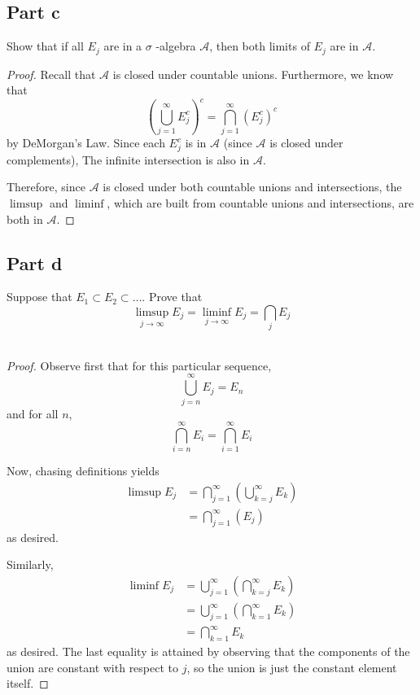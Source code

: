 \documentclass[paper=a4, fontsize=11pt]{scrartcl} %
\numberwithin{equation}{section} %
\numberwithin{figure}{section} %
\numberwithin{table}{section} %
\begin{document}
\subsection*{Part c}
Show that if all $E_j$ are in a $\sigma$ -algebra $\mathcal{A}$, then both limits of $E_j$ are
in $\mathcal{A}$.
\\
\begin{proof}
Recall that $\mathcal{A}$ is closed under countable unions. Furthermore, we know that
\[
\left(\bigcup_{j=1}^{\infty} E_j^c\right)^c = \bigcap_{j=1}^{\infty} \left(E_j^c\right)^c
\]
by DeMorgan's Law. Since each $E_j^c$ is in $\mathcal{A}$ (since $\mathcal{A}$ is closed under
complements), The infinite intersection is also in $\mathcal{A}$.

Therefore, since $\mathcal{A}$ is closed under both countable unions and intersections,
the $\limsup$ and $\liminf$, which are built from countable unions and intersections,
are both in $\mathcal{A}$.
\end{proof}

\subsection*{Part d}
Suppose that $E_1 \subset E_2 \subset \ldots$. Prove that
\[
\limsup_{j\to\infty} E_j = \liminf_{j\to\infty} E_j = \bigcap_j E_j
\]
\\
\begin{proof}
Observe first that for this particular sequence,
\[
\bigcup_{j=n}^{\infty} E_j = E_n
\]
and for all $n$,
\[
\bigcap_{i=n}^{\infty} E_i = \bigcap_{i=1}^{\infty} E_i
\]

Now, chasing definitions yields
\[
\begin{aligned}
\limsup E_j &= \bigcap_{j=1}^{\infty}\left(\bigcup_{k=j}^{\infty}E_k\right)\\
            &= \bigcap_{j=1}^{\infty}\left(E_j\right)
\end{aligned}
\]
as desired.

Similarly,
\[
\begin{aligned}
\liminf E_j &= \bigcup_{j=1}^{\infty}\left(\bigcap_{k=j}^{\infty}E_k\right)\\
            &= \bigcup_{j=1}^{\infty}\left(\bigcap_{k=1}^{\infty}E_k\right)\\
            &= \bigcap_{k=1}^{\infty}E_k
\end{aligned}
\]
as desired. The last equality is attained by observing that the components of the
union are constant with respect to $j$, so the union is just the constant element
itself.
\end{proof}
\end{document}
